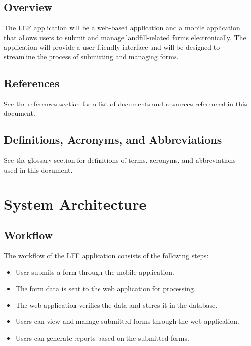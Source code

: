 \documentclass[12pt]{article}
\begin{document}
\subsection{Overview}
The LEF application will be a web-based application and a mobile application that allows users to submit and manage landfill-related forms electronically. The application will provide a user-friendly interface and will be designed to streamline the process of submitting and managing forms.
\subsection{References}
See the references section for a list of documents and resources referenced in this document.
\subsection{Definitions, Acronyms, and Abbreviations}
See the glossary section for definitions of terms, acronyms, and abbreviations used in this document.
\newpage

\section{System Architecture}
\subsection{Workflow}
The workflow of the LEF application consists of the following steps:
\begin{itemize}
    \item User submits a form through the mobile application.
    \item The form data is sent to the web application for processing.
    \item The web application verifies the data and stores it in the database.
    \item Users can view and manage submitted forms through the web application.
    \item Users can generate reports based on the submitted forms.
\end{itemize}
\end{document}
